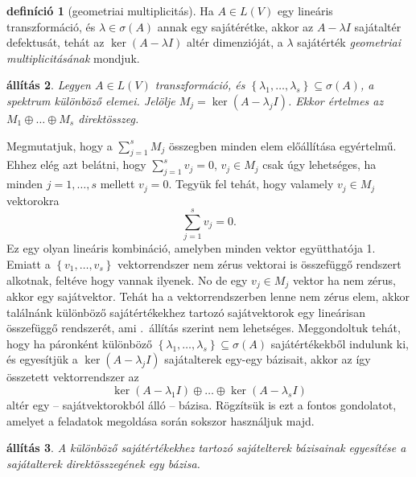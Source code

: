 \documentclass[9pt, a4paper, showtrims]{memoir}
\makeatletter
\renewenvironment{proof}[1][\proofname]
    {\par\pushQED{\qed}%
    \normalfont \topsep6\p@\@plus6\p@\relax
    \trivlist
    \item[\hskip\labelsep
        \itshape
    #1\@addpunct{:}]\ignorespaces}
    {\popQED\endtrivlist\@endpefalse}
\theoremstyle{plain}
\newtheorem{proposition}{állítás}[chapter]
\theoremstyle{remark}
\theoremstyle{definition}
\newtheorem{definition}[proposition]{definíció}
\makeatother
\begin{document}
    \begin{definition}[geometriai multiplicitás]
        Ha $A\in L\left( V \right)$ egy lineáris transzformáció, 
        és $\lambda\in\sigma\left( A \right)$ annak egy sajátérétke,
        akkor az $A-\lambda I$ sajátaltér defektusát, 
        tehát az $\ker\left( A-\lambda I \right)$ altér dimenzióját,
        a $\lambda$ sajátérték \emph{geometriai multiplicitásának}
        mondjuk.
    \end{definition}
    \begin{proposition}
        Legyen $A\in L\left( V \right)$ transzformáció, és
        $\left\{ \lambda_1,\dots,\lambda_s \right\}\subseteq\sigma\left( A \right)$,
        a spektrum különböző elemei.
        Jelölje $M_j=\ker\left( A-\lambda_j I \right)$.
        Ekkor értelmes az $M_1\oplus\dots\oplus M_s$ direktösszeg.
    \end{proposition}
    \begin{proof}
        Megmutatjuk, hogy a $\sum_{j=1}^sM_j$ összegben minden elem előállítása egyértelmű.
        Ehhez elég azt belátni, hogy $\sum_{j=1}^sv_j=0$, $v_j\in M_j$ csak úgy lehetséges, ha
        minden $j=1,\dots,s$ mellett $v_j=0$.
        Tegyük fel tehát, hogy valamely $v_j\in M_j$ vektorokra 
        \[
            \sum_{j=1}^sv_j=0.
        \]
        Ez egy olyan lineáris kombináció, amelyben minden vektor együtthatója 1.
        Emiatt a $\left\{ v_1,\dots,v_s \right\}$ vektorrendszer nem zérus vektorai is összefüggő rendszert alkotnak, 
        feltéve hogy vannak ilyenek.
        No de egy $v_j\in M_j$ vektor ha nem zérus, akkor egy sajátvektor.
        Tehát ha a vektorrendszerben lenne nem zérus elem, 
        akkor találnánk különböző sajátértékekhez tartozó sajátvektorok egy lineárisan összefüggő rendszerét, 
        ami .~állítás szerint nem lehetséges.
    \end{proof}
    Meggondoltuk tehát,
    hogy ha páronként különböző $\left\{ \lambda_1,\dots,\lambda_s \right\}\subseteq\sigma\left( A \right)$ sajátértékekből indulunk ki,
    és egyesítjük a $\ker\left( A-\lambda_j I \right)$ sajátalterek egy-egy bázisait,
    akkor az így összetett vektorrendszer az
    \[
        \ker\left( A-\lambda_1 I \right)\oplus\dots\oplus\ker\left( A-\lambda_s I \right)
    \]
    altér egy -- sajátvektorokból álló -- bázisa.
    Rögzítsük is ezt a fontos gondolatot, 
    amelyet a feladatok megoldása során sokszor használjuk majd.
    \begin{proposition}
        A különböző sajátértékekhez tartozó sajátelterek bázisainak egyesítése a sajátalterek direktösszegének egy bázisa.
    \end{proposition}
\end{document}
